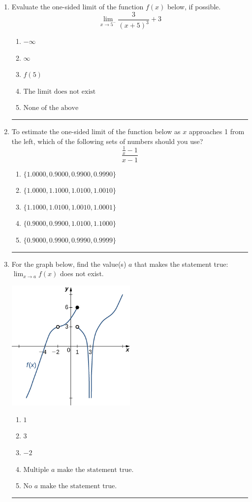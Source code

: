 \documentclass[14pt]{extbook}
\newcommand{\litem}[1]{\item#1\hspace*{-1cm}\rule{\textwidth}{0.4pt}}
\begin{document}
\begin{enumerate}
{\begin{enumerate}[label=\Alph*.]
\end{enumerate} }
\litem{
Evaluate the one-sided limit of the function $f(x)$ below, if possible.\[ \lim_{x \rightarrow 5^-} \frac{3}{(x+5)^3}+3 \]\begin{enumerate}[label=\Alph*.]
\item \( -\infty \)
\item \( \infty \)
\item \( f(5) \)
\item \( \text{The limit does not exist} \)
\item \( \text{None of the above} \)

\end{enumerate} }
\litem{
To estimate the one-sided limit of the function below as $x$ approaches 1 from the left, which of the following sets of numbers should you use?\[ \frac{\frac{1}{x} - 1}{x - 1} \]\begin{enumerate}[label=\Alph*.]
\item \( \{ 1.0000, 0.9000, 0.9900, 0.9990 \} \)
\item \( \{ 1.0000, 1.1000, 1.0100, 1.0010 \} \)
\item \( \{ 1.1000, 1.0100, 1.0010, 1.0001 \} \)
\item \( \{ 0.9000, 0.9900, 1.0100, 1.1000 \} \)
\item \( \{ 0.9000, 0.9900, 0.9990, 0.9999 \} \)

\end{enumerate} }
\litem{
For the graph below, find the value(s) $a$ that makes the statement true: $ \displaystyle \lim_{x \rightarrow a} f(x)$ does not exist.
\begin{center}
    \includegraphics[width=0.5\textwidth]{../Figures/evaluateLimitGraphicallyC.png}
\end{center}
\begin{enumerate}[label=\Alph*.]
\item \( 1 \)
\item \( 3 \)
\item \( -2 \)
\item \( \text{Multiple } a \text{ make the statement true}. \)
\item \( \text{No } a \text{ make the statement true}. \)


\end{enumerate}}
\end{enumerate}
\end{document}
